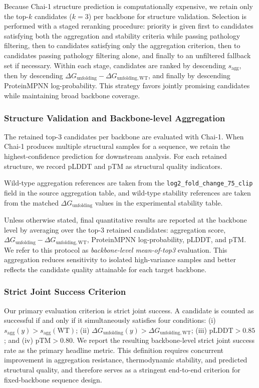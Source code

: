 \documentclass[pdflatex,sn-mathphys-num]{sn-jnl}%
\theoremstyle{thmstyleone}%
\theoremstyle{thmstyletwo}%
\theoremstyle{thmstylethree}%
\begin{document}
Because Chai-1 structure prediction is computationally expensive, we retain only the top-$k$ candidates ($k=3$) per backbone for structure validation. Selection is performed with a staged reranking procedure: priority is given first to candidates satisfying both the aggregation and stability criteria while passing pathology filtering, then to candidates satisfying only the aggregation criterion, then to candidates passing pathology filtering alone, and finally to an unfiltered fallback set if necessary. Within each stage, candidates are ranked by descending $s_{\mathrm{agg}}$, then by descending $\Delta G_{\mathrm{unfolding}}-\Delta G_{\mathrm{unfolding,WT}}$, and finally by descending ProteinMPNN log-probability. This strategy favors jointly promising candidates while maintaining broad backbone coverage.

\subsubsection{Structure Validation and Backbone-level Aggregation}

The retained top-3 candidates per backbone are evaluated with Chai-1. When Chai-1 produces multiple structural samples for a sequence, we retain the highest-confidence prediction for downstream analysis. For each retained structure, we record pLDDT and pTM as structural quality indicators.

Wild-type aggregation references are taken from the \texttt{log2\_fold\_change\_75\_clip} field in the source aggregation table, and wild-type stability references are taken from the matched $\Delta G_{\mathrm{unfolding}}$ values in the experimental stability table.

Unless otherwise stated, final quantitative results are reported at the backbone level by averaging over the top-3 retained candidates: aggregation score, $\Delta G_{\mathrm{unfolding}}-\Delta G_{\mathrm{unfolding,WT}}$, ProteinMPNN log-probability, pLDDT, and pTM. We refer to this protocol as \emph{backbone-level mean-of-top3} evaluation. This aggregation reduces sensitivity to isolated high-variance samples and better reflects the candidate quality attainable for each target backbone.

\subsubsection{Strict Joint Success Criterion}

Our primary evaluation criterion is strict joint success. A candidate is counted as successful if and only if it simultaneously satisfies four conditions: (i) $s_{\mathrm{agg}}(y) > s_{\mathrm{agg}}(\mathrm{WT})$; (ii) $\Delta G_{\mathrm{unfolding}}(y) > \Delta G_{\mathrm{unfolding,WT}}$; (iii) $\mathrm{pLDDT} > 0.85$; and (iv) $\mathrm{pTM} > 0.80$. We report the resulting backbone-level strict joint success rate as the primary headline metric. This definition requires concurrent improvement in aggregation resistance, thermodynamic stability, and predicted structural quality, and therefore serves as a stringent end-to-end criterion for fixed-backbone sequence design.
\end{document}
